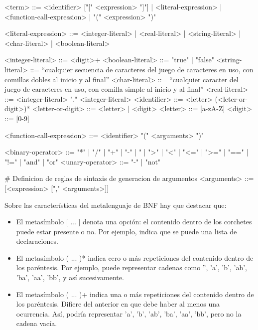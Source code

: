 \begin{BNFCode}
<term> ::= <identifier> ["[" <expression> "]"]
	| <literal-expression>
	| <function-call-expression>
	| "(" <expression> ")"
	
<literal-expression> ::= <integer-literal>
	| <real-literal>
	| <string-literal>
	| <char-literal>
	| <boolean-literal>
	
<integer-literal> ::= <digit>+
<boolean-literal> ::= "true" | "false"
<string-literal> ::= ``cualquier secuencia de caracteres del juego de caracteres en uso, con comillas dobles al inicio y al final''
<char-literal> ::= ``cualquier caracter del juego de caracteres en uso, con comilla simple al inicio y al final''
<real-literal> ::= <integer-literal> "." <integer-literal>
<identifier> ::= <letter> (<leter-or-digit>)*
<letter-or-digit> ::= <letter> | <digit>
<letter> ::= [a-zA-Z]
<digit> ::= [0-9]

<function-call-expression> ::= <identifier> "(" <arguments> ")"

<binary-operator> ::= "*" | "/" | "+" | "-" | "%
 	| ">" | "<" | "<=" | ">=" | "==" | "!="
	| "and" | "or"
<unary-operator> ::= "-" | "not"

# Definicion de reglas de sintaxis de generacion de argumentos
<arguments> ::= [<expression> ["," <arguments>]]
\end{BNFCode}

\newpage

\noindent
Sobre las características del metalenguaje de BNF hay que destacar que:
\begin{itemize}
    \item El metasímbolo [ ... ] denota una opción: el contenido dentro de los corchetes puede estar presente o no. Por ejemplo, \code{[<declarations>]} indica que se puede una lista de declaraciones.
    \item El metasímbolo ( ... )* indica cero o más repeticiones del contenido dentro de los paréntesis. Por ejemplo,  puede representar cadenas como '', 'a', 'b', 'ab', 'ba', 'aa', 'bb', y así sucesivamente.
    \item El metasímbolo ( ... )+ indica una o más repeticiones del contenido dentro de los paréntesis. Difiere del anterior en que debe haber al menos una ocurrencia. Así,  podría representar 'a', 'b', 'ab', 'ba', 'aa', 'bb', pero no la cadena vacía.
\end{itemize}

